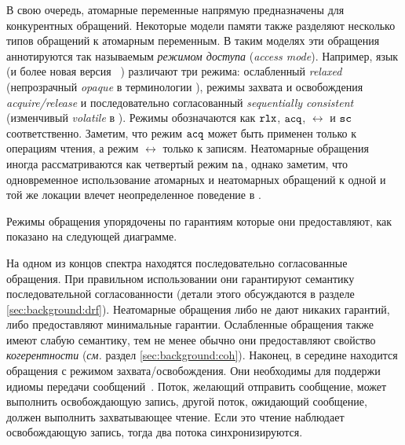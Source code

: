 В свою очередь, атомарные переменные напрямую 
предназначены для конкурентных обращений. 
Некоторые модели памяти также разделяют 
несколько типов обращений к атомарным переменным.
В таким моделях эти обращения аннотируются 
так называемым \emph{режимом доступа} (\emph{access mode}).
Например, язык \CPP (и более новая версия \Java~\cite{Bender-Palsberg:OOPSLA19})
различают три режима: ослабленный \emph{relaxed}
(непрозрачный \emph{opaque} в терминологии \Java),
режимы захвата и освобождения \emph{acquire/release} 
и последовательно согласованный \emph{sequentially consistent}
(изменчивый \emph{volatile} в \Java). 
Режимы обозначаются как $\mathtt{rlx}$, ${\mathtt{acq}}$, $\rel$ и ${\mathtt{sc}}$ соответственно.
Заметим, что режим ${\mathtt{acq}}$ может быть применен только к операциям чтения,
а режим $\rel$ только к записям.
Неатомарные обращения иногда рассматриваются как четвертый режим $\mathtt{na}$, 
однако заметим, что одновременное использование атомарных 
и неатомарных обращений к одной и той же локации 
влечет неопределенное поведение в \CPP.

Режимы обращения упорядочены по гарантиям 
которые они предоставляют, как показано на следующей диаграмме. 




На одном из концов спектра находятся последовательно согласованные обращения.
При правильном использовании они гарантируют семантику 
последовательной согласованности
(детали этого обсуждаются в разделе \cref{sec:background:drf}).
Неатомарные обращения либо не дают никаких гарантий, 
либо предоставляют минимальные гарантии. 
Ослабленные обращения также имеют слабую семантику, 
тем не менее обычно они предоставляют свойство \emph{когерентности}
(\emph{см.} раздел \cref{sec:background:coh}).
Наконец, в середине находится обращения с режимом захвата/освобождения. 
Они необходимы для поддержи идиомы передачи сообщений~\cite{Lahav-al:POPL16}.
Поток, желающий отправить сообщение, может выполнить освобождающую запись, 
другой поток, ожидающий сообщение, должен выполнить захватывающее чтение. 
Если это чтение наблюдает освобождающую запись, 
тогда два потока синхронизируются.

